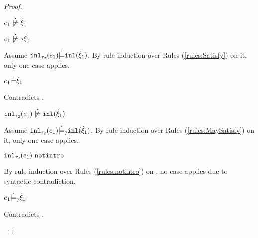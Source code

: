 \begin{proof}
\begin{byCases}
\begin{byCases}
\begin{byCases}
        \item[\cnotsatisfyormay{e_1}{\hxi_1}]
            \begin{pfsteps*}
            \item $\cnotsatisfy{e_1}{\hxi_1}$  
            \item $\cnotmaysatisfy{e_1}{\hxi_1}$  
            \end{pfsteps*}
            Assume $\mathtt{inl}_{\tau_2}({e_1}) \dot{\models} \mathtt{inl}(\dot{\xi}_1)$. By rule induction over Rules (\ref{rules:Satisfy}) on it, only one case applies.
            \begin{byCases}
            \item[\text{(\ref{rule:CSInl})}]
                \begin{pfsteps*}
                \item $e_1 \dot{\models} \dot{\xi}_1$
                \end{pfsteps*}
                Contradicts .
            \end{byCases}
            \begin{pfsteps*}
            \item $\cnotsatisfy{\hinl{\tau_2}{e_1}}{\cinl{\hxi_1}}$  
            \end{pfsteps*}
            Assume $\mathtt{inl}_{\tau_2}({e_1}) \dot{\models}_{?} \mathtt{inl}(\dot{\xi}_1)$. By rule induction over Rules (\ref{rules:MaySatisfy}) on it, only one case applies.
            \begin{byCases}
            \item[\text{(\ref{rule:CMSNotIntro})}]
                \begin{pfsteps*}
                \item $\mathtt{inl}_{\tau_2}({e_1}) ~\mathtt{notintro}$  
                \end{pfsteps*}
                By rule induction over Rules (\ref{rules:notintro}) on , no case applies due to syntactic contradiction.
            \item[\text{(\ref{rule:CMSInl})}]
                \begin{pfsteps*}
                \item $e_1 \dot{\models}_{?} \dot{\xi}_1$
                \end{pfsteps*}
                Contradicts .

\end{byCases}
\end{byCases}
\end{byCases}
\end{byCases}
\end{proof}
